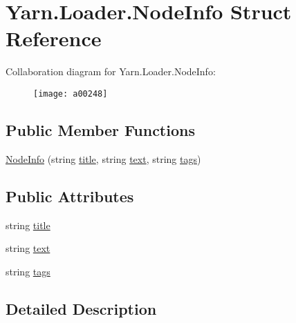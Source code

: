 \hypertarget{a00056}{\section{Yarn.\-Loader.\-Node\-Info Struct Reference}
\label{a00056}
}


Collaboration diagram for Yarn.\-Loader.\-Node\-Info\-:
\nopagebreak
\begin{figure}[H]
\begin{center}
\leavevmode
\texttt{[image: a00248]}
\end{center}
\end{figure}
\subsection*{Public Member Functions}
\begin{DoxyCompactItemize}
\item 
\hyperlink{a00056_aa56085ea115b77cb9ee975686e726c29}{Node\-Info} (string \hyperlink{a00056_aafc45bbc86a9acb9bdbcf7877695a96c}{title}, string \hyperlink{a00056_a63d7ebed8095a20fc5d0d74c84a34f6c}{text}, string \hyperlink{a00056_acd4d4915f6cc14f8b0f1f92d27da8b36}{tags})
\end{DoxyCompactItemize}
\subsection*{Public Attributes}
\begin{DoxyCompactItemize}
\item 
string \hyperlink{a00056_aafc45bbc86a9acb9bdbcf7877695a96c}{title}
\item 
string \hyperlink{a00056_a63d7ebed8095a20fc5d0d74c84a34f6c}{text}
\item 
string \hyperlink{a00056_acd4d4915f6cc14f8b0f1f92d27da8b36}{tags}
\end{DoxyCompactItemize}


\subsection{Detailed Description}


